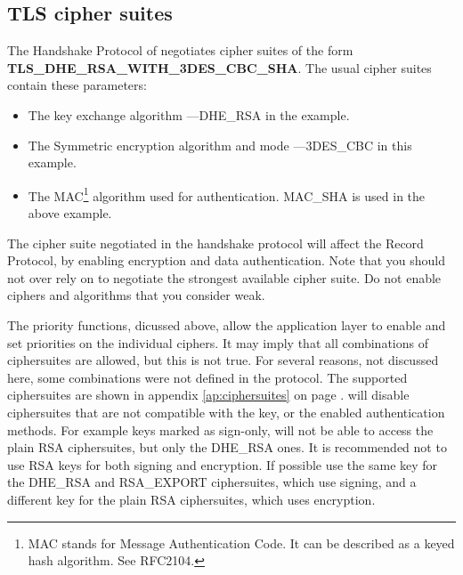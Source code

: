 \subsection*{TLS cipher suites}
\par 
The Handshake Protocol of \tlsI{} negotiates cipher suites 
of the form \\
{\bf TLS\_DHE\_RSA\_WITH\_3DES\_CBC\_SHA}.
The usual cipher suites contain these parameters:
\begin{itemize}
\item The key exchange algorithm ---DHE\_RSA in the example.
\item The Symmetric encryption algorithm and mode ---3DES\_CBC in this
example.
\item The MAC\footnote{MAC stands for Message Authentication Code. It can
be described as a keyed hash algorithm. See RFC2104.} algorithm used for authentication.
MAC\_SHA is used in the above example.
\end{itemize}

The cipher suite negotiated in the handshake protocol will affect
the Record Protocol, by enabling encryption and data authentication.
Note that you should not over rely on \tls{} to negotiate the strongest 
available cipher suite. Do not enable ciphers and algorithms that you consider weak.
\par
The priority functions, dicussed above, allow the application layer to enable
and set priorities on the individual ciphers. It may imply that all combinations of ciphersuites
are allowed, but this is not true. For several reasons, not discussed here, some combinations 
were not defined in the \tls{} protocol. The supported ciphersuites are shown
in appendix \ref{ap:ciphersuites} on page \pageref{ap:ciphersuites}.
\gnutls{} will disable ciphersuites that are not compatible with the key, or
the enabled authentication methods.
For example keys marked as sign-only, will not be able to
access the plain RSA ciphersuites, but only the DHE\_RSA ones. It is
recommended not to use RSA keys for both signing and encryption. If possible
use the same key for the DHE\_RSA and RSA\_EXPORT ciphersuites, which use signing,
and a different key for the plain RSA ciphersuites, which uses encryption.

\addvspace{1.5cm}
